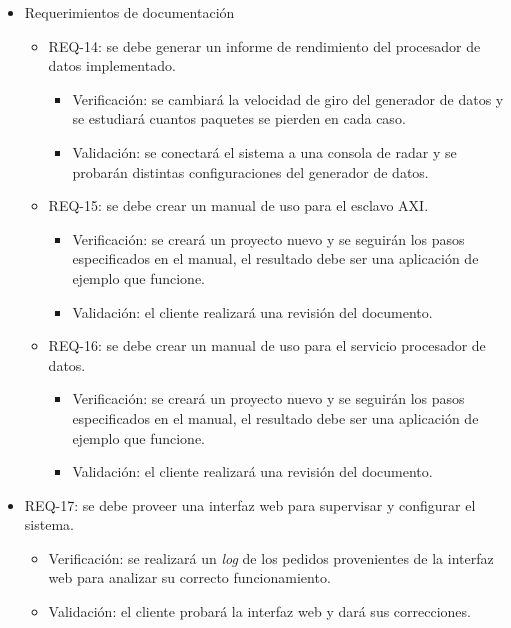 \documentclass[
11pt, %
]{charter}
\begin{document}
\begin{itemize}
	\item Requerimientos de documentación
		\begin{itemize}
      \item REQ-14: se debe generar un informe de rendimiento del procesador de
        datos implementado.
        \begin{itemize}
          \item Verificación: se cambiará la velocidad de giro del generador de
            datos y se estudiará cuantos paquetes se pierden en cada caso.
          \item Validación: se conectará el sistema a una consola de radar y se
            probarán distintas configuraciones del generador de datos.
        \end{itemize}
      \item REQ-15: se debe crear un manual de uso para el esclavo AXI.
        \begin{itemize}
          \item Verificación: se creará un proyecto nuevo y se seguirán los
            pasos especificados en el manual, el resultado debe ser una
            aplicación de ejemplo que funcione.
          \item Validación: el cliente realizará una revisión del documento.
        \end{itemize}
      \item REQ-16: se debe crear un manual de uso para el servicio procesador de datos.
        \begin{itemize}
          \item Verificación: se creará un proyecto nuevo y se seguirán los
          pasos especificados en el manual, el resultado debe ser una
          aplicación de ejemplo que funcione.
          \item Validación: el cliente realizará una revisión del documento.
        \end{itemize}
      \end{itemize}
    \item REQ-17: se debe proveer una interfaz web para supervisar y configurar el sistema.
      \begin{itemize}
        \item Verificación: se realizará un \emph{log} de los pedidos
          provenientes de la interfaz web para analizar su correcto funcionamiento.
        \item Validación: el cliente probará la interfaz web y dará sus correcciones.
      \end{itemize}
\end{itemize}
\end{document}
